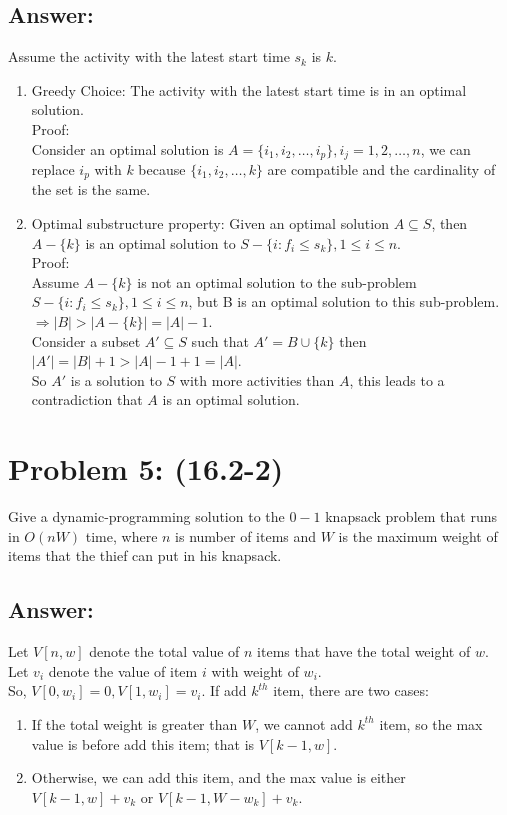 \documentclass[a4paper]{article}
\begin{document}
\subsection*{Answer:}
Assume the activity with the latest start time $s_k$ is $k$.\\
\begin{enumerate}
    \item Greedy Choice: The activity with the latest start time is in an optimal solution.\\
    Proof:\\
    Consider an optimal solution is $A=\{i_1, i_2,\dots, i_p\}, i_j =1,2,\dots, n$, we can replace $i_p$ with $k$ because $\{i_1, i_2,\dots, k\}$ are compatible and the cardinality of the set is the same.
    \item Optimal substructure property: Given an optimal solution $A\subseteq S$, then $A-\{k\}$ is an optimal solution to $S-\{i:f_i\leq s_k\},1\leq i\leq n$.\\
    Proof:\\
    Assume $A-\{k\}$ is not an optimal solution to the sub-problem $S-\{i:f_i\leq s_k\},1\leq i\leq n$, but B is an optimal solution to this sub-problem.
    $\Rightarrow |B|>|A-\{k\}|=|A|-1$.\\
    Consider a subset $A'\subseteq S$ such that $A'=B\cup \{k\}$ then $|A'|=|B|+1>|A|-1+1=|A|$.\\
    So $A'$ is a solution to $S$ with more activities than $A$, this leads to a contradiction that $A$ is an optimal solution.
\end{enumerate}

\section*{Problem 5: (16.2-2)} Give a dynamic-programming solution to the $0-1$ knapsack problem that runs in $O(n W)$ time, where $n$ is number of items and $W$ is the maximum weight of items that the thief can put in his knapsack.
\subsection*{Answer:}
Let $V[n,w]$ denote the total value of $n$ items that have the total weight of $w$.\\
Let $v_i$ denote the value of item $i$ with weight of $w_i$.\\
So, $V[0,w_i]=0, V[1, w_i]=v_i$.
If add $k^{th}$ item, there are two cases:\\
\begin{enumerate}
    \item If the total weight is greater than $W$, we cannot add $k^{th}$ item, so the max value is before add this item; that is $V[k-1,w]$.
    \item Otherwise, we can add this item, and the max value is either $V[k-1,w] +v_k$ or $V[k-1,W-w_k]+v_k$.
\end{enumerate}
\end{document}
